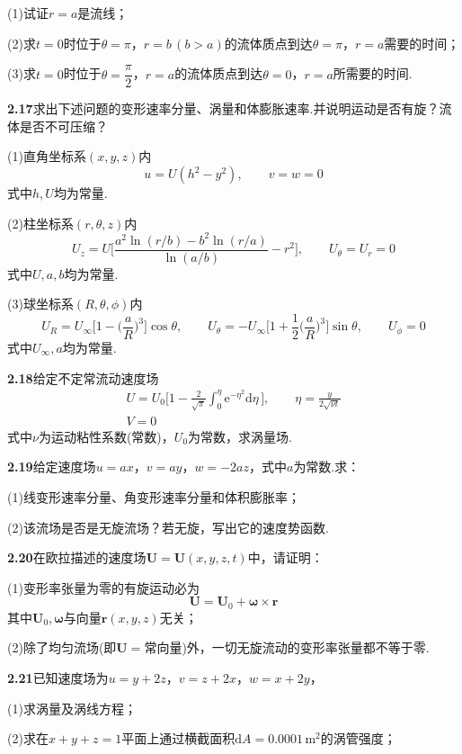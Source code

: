 (1)试证$r=a$是流线；

(2)求$t=0$时位于$\theta=\pi$，$r=b\,(b>a)$的流体质点到达$\theta=\pi$，$r=a$需要的时间；

(3)求$t=0$时位于$\theta=\dfrac{\pi}{2}$，$r=a$的流体质点到达$\theta=0$，$r=a$所需要的时间.

\medskip
\noindent\textbf{2.17}\quad 求出下述问题的变形速率分量、涡量和体膨胀速率.并说明运动是否有旋？流体是否不可压缩？

(1)直角坐标系$(x,y,z)$内
\[
u=U(h^{2}-y^{2}),\qquad v=w=0
\]
式中$h,U$均为常量.

(2)柱坐标系$(r,\theta,z)$内
\[
U_z=U\bigg[\frac{a^{2}\ln(r/b)-b^{2}\ln(r/a)}{\ln(a/b)}-r^{2}\bigg],\qquad U_\theta=U_r=0
\]
式中$U,a,b$均为常量.

(3)球坐标系$(R,\theta,\phi)$内
\[
U_R=U_\infty\Big[1-\Big(\frac{a}{R}\Big)^{3}\Big]\cos\theta,\qquad
U_\theta=-U_\infty\Big[1+\frac{1}{2}\Big(\frac{a}{R}\Big)^{3}\Big]\sin\theta,\qquad U_\phi=0
\]
式中$U_\infty,a$均为常量.

\medskip
\noindent\textbf{2.18}\quad 给定不定常流动速度场
\begin{gather*}
U=U_0\bigg[1-\frac{2}{\sqrt{\pi}}\int_0^{\eta}\mathrm{e}^{-\eta^{2}}\mathrm{d}\eta\,\bigg],\qquad \eta=\frac{y}{2\sqrt{\nu t}}\\[2pt]
V=0
\end{gather*}
式中$\nu$为运动粘性系数(常数)，$U_0$为常数，求涡量场.

\medskip
\noindent\textbf{2.19}\quad 给定速度场$u=ax$，$v=ay$，$w=-2az$，式中$a$为常数.求：

(1)线变形速率分量、角变形速率分量和体积膨胀率；

(2)该流场是否是无旋流场？若无旋，写出它的速度势函数.

\medskip
\noindent\textbf{2.20}\quad 在欧拉描述的速度场$\boldsymbol{U}=\boldsymbol{U}(x,y,z,t)$中，请证明：

(1)变形率张量为零的有旋运动必为
\[
\boldsymbol{U}=\boldsymbol{U}_0+\boldsymbol{\omega}\times\boldsymbol{r}
\]
其中$\boldsymbol{U}_0,\boldsymbol{\omega}$与向量$\boldsymbol{r}(x,y,z)$无关；

(2)除了均匀流场(即$\boldsymbol{U}=$常向量)外，一切无旋流动的变形率张量都不等于零.

\medskip
\noindent\textbf{2.21}\quad 已知速度场为$u=y+2z$，$v=z+2x$，$w=x+2y$，

(1)求涡量及涡线方程；

(2)求在$x+y+z=1$平面上通过横截面积$\mathrm{d}A=0.0001\,\mathrm{m^2}$的涡管强度；

